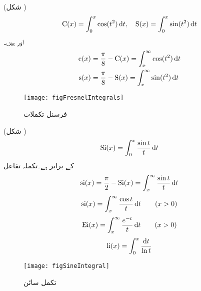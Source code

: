  (شکل )
\begin{align}
\FC(x)=\int_{0}^{x} \cos(t^2)\dif t,\quad \FS(x)=\int_{0}^{x}\sin(t^2)\dif t
\end{align}
 اور  ہیں۔
\begin{align}
\FAC(x)&=\frac{\pi}{8}-\FC(x)=\int_{x}^{\infty} \cos(t^2)\dif t\\
\FAS(x)&=\frac{\pi}{8}-\FS(x)=\int_{x}^{\infty} \sin(t^2)\dif t
\end{align}
%
\begin{figure}
\centering
\texttt{[image: figFresnelIntegrals]}
\caption{فرسنل تکملات}
\label{شکل_ضمیمہ_مفید_فرسنل_تکملات}
\end{figure}
 (شکل )
\begin{align}
\kSi(x)=\int_{0}^{x}\frac{\sin t}{t} \dif t
\end{align}
 کے برابر ہے۔تکملہ تفاعل
\begin{align}
\ksi(x)=\frac{\pi}{2}-\kSi(x)=\int_{x}^{\infty} \frac{\sin t}{t}\dif t
\end{align}
\begin{align}
\ci(x)=\int_{x}^{\infty}\frac{\cos t}{t}\dif t \quad \quad (x>0)
\end{align}
\begin{align}
\Ei(x)=\int_{x}^{\infty} \frac{e^{-t}}{t}\dif t\quad \quad (x>0)
\end{align}
\begin{align}
\li(x)=\int_{0}^{x}\frac{\dif t}{\ln t}
\end{align}
%
\begin{figure}
\centering
\texttt{[image: figSineIntegral]}
\caption{تکمل سائن}
\label{شکل_ضمیمہ_مفید_تکمل_سائن}
\end{figure}
